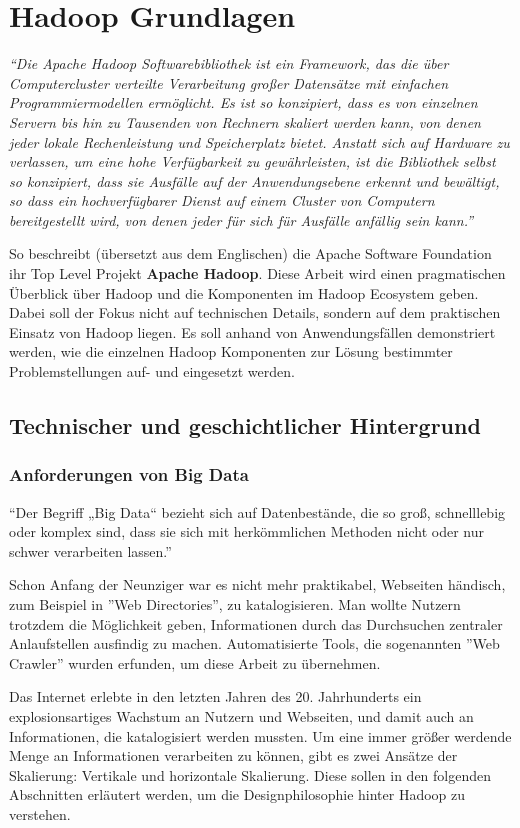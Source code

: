 \chapter{Hadoop Grundlagen}
\textit{``Die Apache Hadoop Softwarebibliothek ist ein Framework, das die über Computercluster verteilte Verarbeitung großer Datensätze mit einfachen Programmiermodellen ermöglicht. Es ist so konzipiert, dass es von einzelnen Servern bis hin zu Tausenden von Rechnern skaliert werden kann, von denen jeder lokale Rechenleistung und Speicherplatz bietet. Anstatt sich auf Hardware zu verlassen, um eine hohe Verfügbarkeit zu gewährleisten, ist die Bibliothek selbst so konzipiert, dass sie Ausfälle auf der Anwendungsebene erkennt und bewältigt, so dass ein hochverfügbarer Dienst auf einem Cluster von Computern bereitgestellt wird, von denen jeder für sich für Ausfälle anfällig sein kann.''}\cite{noauthor_apache_nodate}
\par
So beschreibt (übersetzt aus dem Englischen) die Apache Software Foundation ihr Top Level Projekt \textbf{Apache Hadoop}. Diese Arbeit wird einen pragmatischen Überblick über Hadoop und die Komponenten im Hadoop Ecosystem geben. Dabei soll der Fokus nicht auf technischen Details, sondern auf dem praktischen Einsatz von Hadoop liegen. Es soll anhand von Anwendungsfällen demonstriert werden, wie die einzelnen Hadoop Komponenten zur Lösung bestimmter Problemstellungen auf- und eingesetzt werden.

\section{Technischer und geschichtlicher Hintergrund}
\subsection{Anforderungen von Big Data}
``Der Begriff „Big Data“ bezieht sich auf Datenbestände, die so groß, schnelllebig oder komplex sind, dass sie sich mit herkömmlichen Methoden nicht oder nur schwer verarbeiten lassen.''\cite{noauthor_big_nodate}
\par 
Schon Anfang der Neunziger war es nicht mehr praktikabel, Webseiten händisch, zum Beispiel in ''Web Directories'', zu katalogisieren. Man wollte Nutzern trotzdem die Möglichkeit geben, Informationen durch das Durchsuchen zentraler Anlaufstellen ausfindig zu machen. Automatisierte Tools, die sogenannten ''Web Crawler'' wurden erfunden, um diese Arbeit zu übernehmen.\cite{griffiths_search_2007}
\par 
Das Internet erlebte in den letzten Jahren des 20. Jahrhunderts ein explosionsartiges Wachstum an Nutzern und Webseiten, und damit auch an Informationen, die katalogisiert werden mussten.\cite{zakon_hobbes_2018} 
Um eine immer größer werdende Menge an Informationen verarbeiten zu können, gibt es zwei Ansätze der Skalierung: Vertikale und horizontale Skalierung. Diese sollen in den folgenden Abschnitten erläutert werden, um die Designphilosophie hinter Hadoop zu verstehen.

